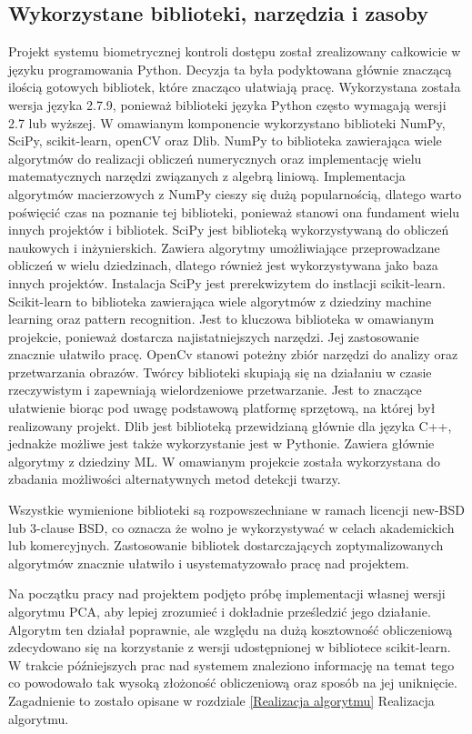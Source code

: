 \documentclass[oneside, eng]{mgr}
\begin{document}
\subsection{Wykorzystane biblioteki, narzędzia i zasoby}
Projekt systemu biometrycznej kontroli dostępu został zrealizowany całkowicie w języku programowania Python. Decyzja ta była podyktowana głównie znaczącą ilością gotowych bibliotek, które znacząco ułatwiają pracę. Wykorzystana została wersja języka 2.7.9, ponieważ biblioteki języka Python często wymagają wersji 2.7 lub wyższej. W omawianym komponencie wykorzystano biblioteki NumPy, SciPy, scikit-learn, openCV oraz Dlib. 
NumPy to biblioteka zawierająca wiele algorytmów do realizacji obliczeń numerycznych oraz implementację wielu matematycznych narzędzi związanych z algebrą liniową. Implementacja algorytmów macierzowych z NumPy cieszy się dużą popularnością, dlatego warto poświęcić czas na poznanie tej biblioteki, ponieważ stanowi ona fundament wielu innych projektów i bibliotek.
SciPy jest biblioteką wykorzystywaną do obliczeń naukowych i inżynierskich. Zawiera algorytmy umożliwiające przeprowadzane obliczeń w wielu dziedzinach, dlatego również jest wykorzystywana jako baza innych projektów.
Instalacja SciPy jest prerekwizytem do instlacji scikit-learn. Scikit-learn to biblioteka zawierająca wiele algorytmów z dziedziny machine learning oraz pattern recognition. Jest to kluczowa biblioteka w omawianym projekcie, ponieważ dostarcza najistatniejszych narzędzi. Jej zastosowanie znacznie ułatwiło pracę.
OpenCv stanowi poteżny zbiór narzędzi do analizy oraz przetwarzania obrazów. Twórcy biblioteki skupiają się na działaniu w czasie rzeczywistym i zapewniają wielordzeniowe przetwarzanie. Jest to znaczące ułatwienie biorąc pod uwagę podstawową platformę sprzętową, na której był realizowany projekt. 
Dlib jest biblioteką przewidzianą głównie dla języka C++, jednakże możliwe jest także wykorzystanie jest w Pythonie. Zawiera głównie algorytmy z dziedziny ML. W omawianym projekcie została wykorzystana do zbadania możliwości alternatywnych metod detekcji twarzy.

Wszystkie wymienione biblioteki są rozpowszechniane w ramach licencji new-BSD lub 3-clause BSD, co oznacza że wolno je wykorzystywać w celach akademickich lub komercyjnych. Zastosowanie bibliotek dostarczających zoptymalizowanych algorytmów znacznie ułatwiło i usystematyzowało pracę nad projektem.

Na początku pracy nad projektem podjęto próbę implementacji własnej wersji algorytmu PCA, aby lepiej zrozumieć i dokładnie prześledzić jego działanie. Algorytm ten działał poprawnie, ale względu na dużą kosztowność obliczeniową zdecydowano się na korzystanie z wersji udostępnionej w bibliotece scikit-learn. W trakcie późniejszych prac nad systemem znaleziono informację na temat tego co powodowało tak wysoką złożoność obliczeniową oraz sposób na jej uniknięcie. Zagadnienie to zostało opisane w rozdziale \ref{Realizacja algorytmu} Realizacja algorytmu.
\end{document}
